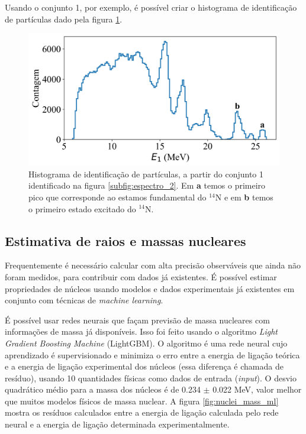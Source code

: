\documentclass[a4paper,12pt,oneside]{book}
\begin{document}
\par Usando o conjunto 1, por exemplo, é possível criar o histograma de identificação de partículas dado pela figura \ref{fig:PID_hist}.

\begin{figure}
    \centering
    \includegraphics[scale=0.11]{figs/espectro_3.png}
    \caption{Histograma de identificação de partículas, a partir do conjunto 1 identificado na figura \ref{subfig:espectro_2}. Em \textbf{a} temos o primeiro pico que corresponde ao estamos fundamental do $^{14}$N e em \textbf{b} temos o primeiro estado excitado do $^{14}$N.}
    \label{fig:PID_hist}
\end{figure}

\subsection{Estimativa de raios e massas nucleares}

\par Frequentemente é necessário calcular com alta precisão observáveis que ainda não foram medidos, para contribuir com dados já existentes. É possível estimar propriedades de núcleos usando modelos e dados experimentais já existentes em conjunto com técnicas de \textit{machine learning}.

\par É possível usar redes neurais que façam previsão de massa nucleares com informações de massa já disponíveis. Isso foi feito usando o algoritmo \textit{Light Gradient Boosting Machine} (LightGBM)\cite{LightGBM}. O algoritmo é uma rede neural cujo aprendizado é supervisionado e minimiza o erro entre a energia de ligação teórica e a energia de ligação experimental dos núcleos (essa diferença é chamada de resíduo), usando 10 quantidades físicas como dados de entrada (\textit{input})\cite{nuclear_mass}. O desvio quadrático médio para a massa dos núcleos é de 0.234 $\pm$ 0.022 MeV, valor melhor que muitos modelos físicos de massa nuclear. A figura \ref{fig:nuclei_mass_ml} mostra os resíduos calculados entre a energia de ligação calculada pelo rede neural e a energia de ligação determinada experimentalmente.
\end{document}
